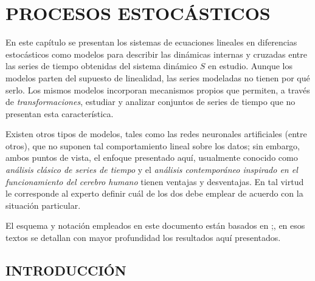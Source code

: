 
\chapter{PROCESOS ESTOCÁSTICOS}

\newpage

En este capítulo se presentan los sistemas de ecuaciones lineales en diferencias estocásticos como modelos para describir las dinámicas internas y cruzadas entre las series de tiempo obtenidas del sistema dinámico $S$ en estudio. Aunque los modelos parten del supuesto de linealidad, las series
modeladas no tienen por qué serlo. Los mismos modelos incorporan mecanismos propios que permiten, a través de \textit{transformaciones}, estudiar y analizar conjuntos de series de tiempo que no presentan esta característica.

Existen otros tipos de modelos, tales como las redes neuronales artificiales (entre otros), que no suponen tal comportamiento lineal sobre los datos; sin embargo, ambos puntos de vista, el enfoque presentado aquí, usualmente conocido como \textit{análisis clásico de series de tiempo} y el \textit{análisis contemporáneo inspirado en el funcionamiento del cerebro humano} tienen ventajas y desventajas.
En tal virtud le corresponde al experto definir cuál de los dos debe emplear de acuerdo con la
situación particular.

El esquema y notación empleados en este documento están basados en  \cite{trivino2012esthocasticModels};\cite{wei1994timeseries}, en esos textos se detallan con mayor profundidad los resultados aquí presentados.


\section{INTRODUCCIÓN}\label{sec:intro1}
\setcounter{equation}{0}

